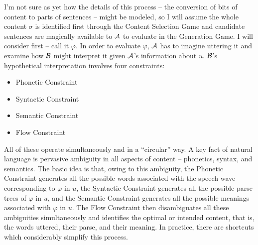 I'm not sure as yet how the details of this process -- the conversion of bits of content to parts of sentences -- might be modeled, so I will assume the whole content $\sigma$ is identified first through the Content Selection Game and candidate sentences are magically available to $\cal A$ to evaluate in the Generation Game. I will consider  first -- call it $\varphi$. In order to evaluate $\varphi$, $\cal A$ has to imagine uttering it and examine how $\cal B$ might interpret it given $\cal A$'s information about $u$. $\cal B$'s hypothetical interpretation involves four constraints:

\begin{itemize}
\item Phonetic Constraint
\item Syntactic Constraint
\item Semantic Constraint
\item Flow Constraint
\end{itemize}
All of these operate simultaneously and in a ``circular'' way. A key fact of natural language is pervasive ambiguity in all aspects of content -- phonetics, syntax, and semantics. The basic idea is that, owing to this ambiguity, the Phonetic Constraint generates all the possible words associated with the speech wave corresponding to $\varphi$ in $u$, the Syntactic Constraint generates all the possible parse trees of $\varphi$ in $u$, and the Semantic Constraint generates all the possible meanings associated with $\varphi$ in $u$. The Flow Constraint then disambiguates all these ambiguities simultaneously and identifies the optimal or intended content, that is, the words uttered, their parse, and their meaning. In practice, there are shortcuts which considerably simplify this process.

